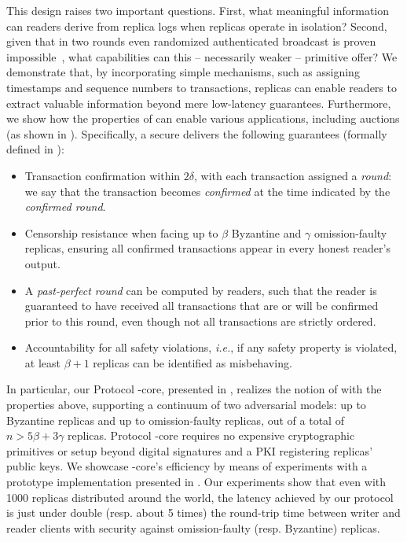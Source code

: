 This design raises two important questions. First, what meaningful information can readers derive from replica logs when replicas operate in isolation? Second, given that in two rounds even randomized authenticated broadcast is proven impossible~\cite{DBLP:conf/focs/GarayKKO07}, what capabilities can this -- necessarily weaker -- primitive offer? We demonstrate that, by incorporating simple mechanisms, such as assigning timestamps and sequence numbers to transactions, replicas can enable readers to extract valuable information beyond mere low-latency guarantees. Furthermore, we show how the properties of \podtm can enable various applications, including auctions (as shown in ).
Specifically, a secure \podtm delivers the following guarantees (formally defined in ):
\begin{itemize}
    \item Transaction confirmation within $2\delta$, with each transaction assigned a \emph{\confirmed round}: we say that the transaction becomes \emph{confirmed} at the time indicated by the \emph{confirmed round}.
    \item Censorship resistance when facing up to $\beta$ Byzantine and $\gamma$ omission-faulty replicas, ensuring all confirmed transactions appear in every honest reader's output.
    \item A \emph{past-perfect round} can be computed by readers, such that the reader is guaranteed to have received all transactions that are or will be confirmed prior to this round, even though not all transactions are strictly ordered.
    \item Accountability for all safety violations, \textit{i.e.}, if any safety property is violated, at least $\beta + 1$ replicas can be identified as misbehaving.
\end{itemize}

In particular, our Protocol \podtm-core, presented in , realizes the notion of \podtm with the properties above, supporting a continuum of two adversarial models: up to \beta Byzantine replicas and up to \gamma omission-faulty replicas, out of a total of $n > 5 \beta + 3 \gamma$ replicas.
Protocol \podtm-core requires no expensive cryptographic primitives or setup beyond digital signatures and a PKI registering replicas' public keys. We showcase \podtm-core's efficiency by means of experiments with a prototype implementation presented in . Our experiments show that even with 1000 replicas distributed around the world, the latency achieved by our protocol is just under double (resp. about 5 times) the round-trip time between writer and reader clients with security against omission-faulty (resp. Byzantine) replicas.


